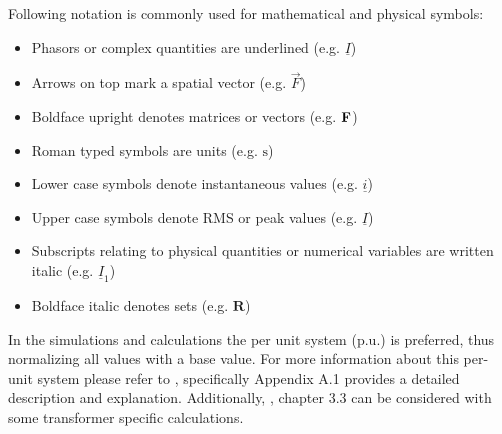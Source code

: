 Following notation is commonly used for mathematical and physical symbols:
\begin{itemize}[noitemsep]
    \item Phasors or complex quantities are underlined (e.g. $\underline{I}$)
    \item Arrows on top mark a spatial vector (e.g. $\overrightarrow{F}$)
    \item Boldface upright denotes matrices or vectors (e.g. $\mathrm{\textbf{F}}$)
    \item Roman typed symbols are units (e.g. $\mathrm{s}$)
    \item Lower case symbols denote instantaneous values (e.g. $\underline{i}$)
    \item Upper case symbols denote \acs{RMS} or peak values (e.g. $\underline{I}$)
    \item Subscripts relating to physical quantities or numerical variables are written italic (e.g. $\underline{I}_1$) 
    \item Boldface italic denotes sets (e.g. $\boldsymbol{R}$)
\end{itemize}

In the simulations and calculations the per unit system ($\mathrm{p.u.}$) is preferred, thus normalizing all values with a base value. 
For more information about this per-unit system please refer to \textcite{machowski_2020}, specifically Appendix A.1 provides a detailed description and explanation. Additionally, \textcite{glover_2017a}, chapter 3.3 can be considered with some transformer specific calculations.